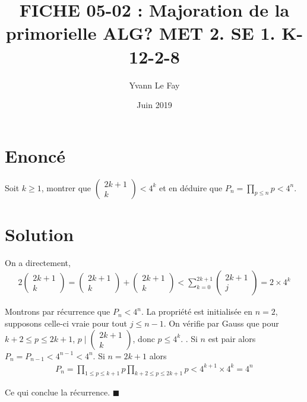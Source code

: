 \documentclass{article}
\newcommand*{\QED}{\hfill\ensuremath{\blacksquare}}%
\begin{document}
\title{FICHE 05-02 : Majoration de la primorielle ALG? MET 2. SE 1. K-12-2-8}
\author{Yvann Le Fay}
\date{Juin 2019}
\maketitle

\section*{Enoncé}
Soit $k\geq 1$, montrer que $\begin{pmatrix}
2k+1\\k
\end{pmatrix}< 4^k$ et en déduire que $P_n = \prod_{p\leq n}p< 4^n$.
\section*{Solution}
On a directement,
\begin{align*}
2\begin{pmatrix}
2k+1\\k
\end{pmatrix}=\begin{pmatrix}
2k+1\\k
\end{pmatrix}+\begin{pmatrix}
2k+1\\
k
\end{pmatrix}<\sum_{k=0}^{2k+1} \begin{pmatrix}
2k+1\\
j
\end{pmatrix}=2\times 4^k
\end{align*}

Montrons par récurrence que $P_n< 4^n$. La propriété est initialisée en $n=2$, supposons celle-ci vraie pour tout $j\leq n-1$. On vérifie par Gauss que pour $k+2\leq p\leq 2k+1$, $p\mid \begin{pmatrix}2k+1\\k\end{pmatrix}$, donc $p\leq 4^k$. . Si $n$ est pair alors $P_{n}=P_{n-1}<4^{n-1}<4^n$. Si $n=2k+1$ alors 
\begin{align*}
P_{n}=\prod_{1\leq p\leq k+1}p \prod_{k+2\leq p \leq 2k+1}p< 4^{k+1}\times 4^{k}=4^n
\end{align*}

Ce qui conclue la récurrence.
\QED
\end{document}
